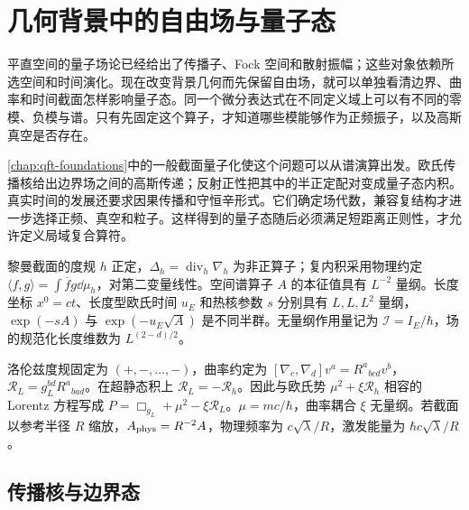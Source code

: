\chapter{几何背景中的自由场与量子态}\label{chap:ghs-geometric-free-states}
\label{chap:ghs-quantum-boundary-states}
\label{chap:ghs-free-field-arbitrary-slice}
\label{chap:ghs-state-operator-general-setting}
\label{chap:ghs-causal-field-algebra}
\label{chap:ghs-r6-hyperbolic-symplectic}
\label{chap:ghs-lorentzian-general}

平直空间的量子场论已经给出了传播子、Fock 空间和散射振幅；这些对象依赖所选空间和时间演化。现在改变背景几何而先保留自由场，就可以单独看清边界、曲率和时间截面怎样影响量子态。同一个微分表达式在不同定义域上可以有不同的零模、负模与谱。只有先固定这个算子，才知道哪些模能够作为正频振子，以及高斯真空是否存在。

\cref{chap:qft-foundations}中的一般截面量子化使这个问题可以从谱演算出发。欧氏传播核给出边界场之间的高斯传递；反射正性把其中的半正定配对变成量子态内积。真实时间的发展还要求因果传播和守恒辛形式。它们确定场代数，兼容复结构才进一步选择正频、真空和粒子。这样得到的量子态随后必须满足短距离正则性，才允许定义局域复合算符。

\begin{definition}
黎曼截面的度规 $h$ 正定，$\Delta_h=\operatorname{div}_h\nabla_h$ 为非正算子；复内积采用物理约定 $\langle f,g\rangle=\int\overline f g\dd\mu_h$，对第二变量线性。空间谱算子 $A$ 的本征值具有 $L^{-2}$ 量纲。长度坐标 $x^0=ct$、长度型欧氏时间 $u_E$ 和热核参数 $s$ 分别具有 $L,L,L^2$ 量纲，$\exp(-sA)$ 与 $\exp(-u_E\sqrt A)$ 是不同半群。无量纲作用量记为 $\mathscr I=I_E/\hbar$，场的规范化长度维数为 $L^{(2-d)/2}$。

洛伦兹度规固定为 $(+,-,\ldots,-)$，曲率约定为 $[\nabla_c,\nabla_d]v^a=R^a{}_{bcd}v^b$，$\mathcal R_L=g_L^{bd}R^a{}_{bad}$。在超静态积上 $\mathcal R_L=-\mathcal R_h$。因此与欧氏势 $\mu^2+\xi\mathcal R_h$ 相容的 Lorentz 方程写成 $P=\Box_{g_L}+\mu^2-\xi\mathcal R_L$。$\mu=mc/\hbar$，曲率耦合 $\xi$ 无量纲。若截面以参考半径 $R$ 缩放，$A_{\rm phys}=R^{-2}A$，物理频率为 $c\sqrt\lambda/R$，激发能量为 $\hbar c\sqrt\lambda/R$。
\end{definition}

\section{传播核与边界态}
\label{sec:ghs-euclidean-boundary-kernels}


